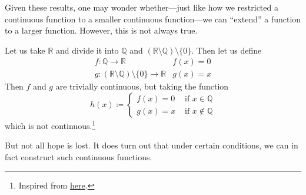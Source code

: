   Given these results, one may wonder whether---just like how we restricted a continuous function to a smaller continuous function---we can ``extend'' a function to a larger function. However, this is not always true. 

  \begin{example}
    Let us take $\mathbb{R}$ and divide it into $\mathbb{Q}$ and $(\mathbb{R} \setminus \mathbb{Q}) \setminus \{0\}$. Then let us define 
    \begin{align}
      f: \mathbb{Q} \rightarrow \mathbb{R} & f(x) = 0 \\ 
      g: (\mathbb{R} \setminus \mathbb{Q}) \setminus \{0\} \rightarrow \mathbb{R} & g(x) = x
    \end{align}
    Then $f$ and $g$ are trivially continuous, but taking the function 
    \begin{equation}
      h(x) \coloneqq \begin{cases} 
        f(x) = 0 & \text{ if } x \in \mathbb{Q} \\ 
        g(x) = x & \text{ if } x \not\in \mathbb{Q}
      \end{cases}
    \end{equation}
    which is not continuous.\footnote{Inspired from \href{https://math.stackexchange.com/questions/4034361/any-counter-example-of-pasting-lemma}{here}. }
  \end{example} 

  But not all hope is lost. It does turn out that under certain conditions, we can in fact construct such continuous functions. 

